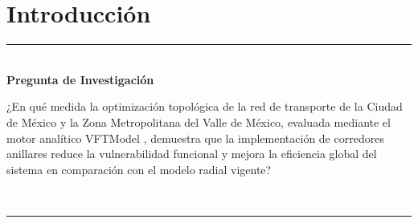 
\section{Introducción}


\begin{frame}[plain]
  \hspace{0.8cm}%
  \begin{minipage}{0.88\textwidth}
    \vspace{2.2cm}
    {\color{ColorAcento}\rule{0.5\textwidth}{1.2pt}}\\[0.5cm]
    {\large\bfseries\color{ColorPrincipal}
      Pregunta de Investigación}\\[0.6cm]
    {\normalsize\color{black}

    ¿En qué medida la optimización topológica de la red de transporte de la Ciudad de
    México y la Zona Metropolitana del Valle de México, evaluada mediante el motor analítico
    VFTModel \citep{garibaldi2023vft}, demuestra que la implementación de corredores anillares 
    reduce la vulnerabilidad funcional y mejora la eficiencia global del sistema en comparación
    con el modelo radial vigente?}\\[0.5cm]
    {\color{ColorAcento}\rule{0.3\textwidth}{0.8pt}}
    \vfill
  \end{minipage}
\end{frame}

